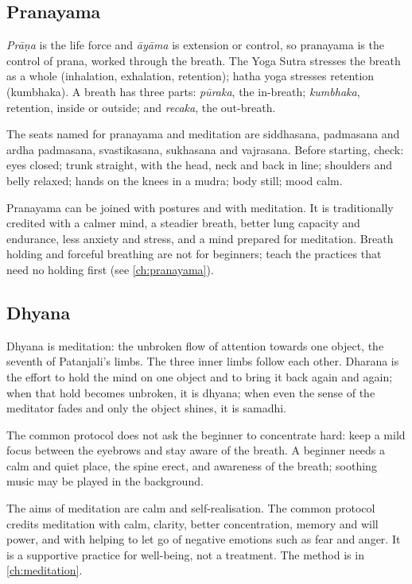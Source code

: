 \subsection*{Pranayama}
\emph{Prāṇa} is the life force and \emph{āyāma} is extension or control, so pranayama is the control of prana, worked through the breath. The Yoga Sutra stresses the breath as a whole (inhalation, exhalation, retention); hatha yoga stresses retention (kumbhaka). A breath has three parts: \emph{pūraka}, the in-breath; \emph{kumbhaka}, retention, inside or outside; and \emph{recaka}, the out-breath.

The seats named for pranayama and meditation are siddhasana, padmasana and ardha padmasana, svastikasana, sukhasana and vajrasana. Before starting, check: eyes closed; trunk straight, with the head, neck and back in line; shoulders and belly relaxed; hands on the knees in a mudra; body still; mood calm.

Pranayama can be joined with postures and with meditation. It is traditionally credited with a calmer mind, a steadier breath, better lung capacity and endurance, less anxiety and stress, and a mind prepared for meditation. Breath holding and forceful breathing are not for beginners; teach the practices that need no holding first (see \cref{ch:pranayama}).

\subsection*{Dhyana}
Dhyana is meditation: the unbroken flow of attention towards one object, the seventh of Patanjali's limbs. The three inner limbs follow each other. Dharana is the effort to hold the mind on one object and to bring it back again and again; when that hold becomes unbroken, it is dhyana; when even the sense of the meditator fades and only the object shines, it is samadhi.

The common protocol does not ask the beginner to concentrate hard: keep a mild focus between the eyebrows and stay aware of the breath. A beginner needs a calm and quiet place, the spine erect, and awareness of the breath; soothing music may be played in the background.

The aims of meditation are calm and self-realisation. The common protocol credits meditation with calm, clarity, better concentration, memory and will power, and with helping to let go of negative emotions such as fear and anger. It is a supportive practice for well-being, not a treatment. The method is in \cref{ch:meditation}.


